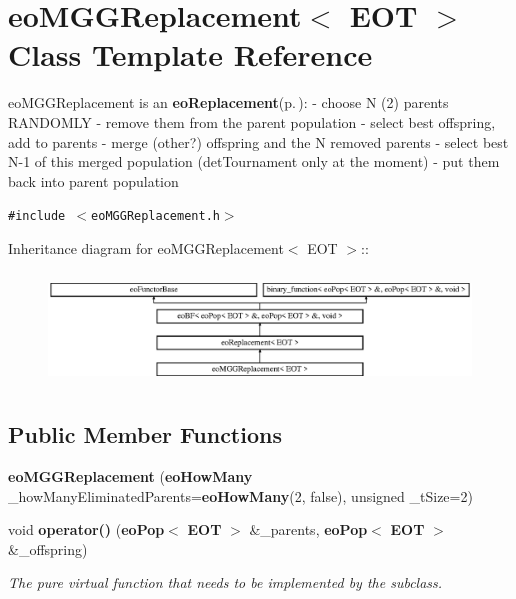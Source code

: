 \section{eo\-MGGReplacement$<$ EOT $>$ Class Template Reference}
\label{classeo_m_g_g_replacement}
eo\-MGGReplacement is an {\bf eo\-Replacement}{\rm (p.\,\pageref{classeo_replacement})}: - choose N (2) parents RANDOMLY - remove them from the parent population - select best offspring, add to parents - merge (other?) offspring and the N removed parents - select best N-1 of this merged population (det\-Tournament only at the moment) - put them back into parent population  


{\tt \#include $<$eo\-MGGReplacement.h$>$}

Inheritance diagram for eo\-MGGReplacement$<$ EOT $>$::\begin{figure}[H]
\begin{center}
\leavevmode
\includegraphics[height=3.01075cm]{classeo_m_g_g_replacement}
\end{center}
\end{figure}
\subsection*{Public Member Functions}
\begin{CompactItemize}
\item 
{\bf eo\-MGGReplacement} ({\bf eo\-How\-Many} \_\-how\-Many\-Eliminated\-Parents={\bf eo\-How\-Many}(2, false), unsigned \_\-t\-Size=2)\label{classeo_m_g_g_replacement_a0}

\item 
void {\bf operator()} ({\bf eo\-Pop}$<$ {\bf EOT} $>$ \&\_\-parents, {\bf eo\-Pop}$<$ {\bf EOT} $>$ \&\_\-offspring)\label{classeo_m_g_g_replacement_a1}

\begin{CompactList}\small\item\em The pure virtual function that needs to be implemented by the subclass. \item\end{CompactList}\end{CompactItemize}
